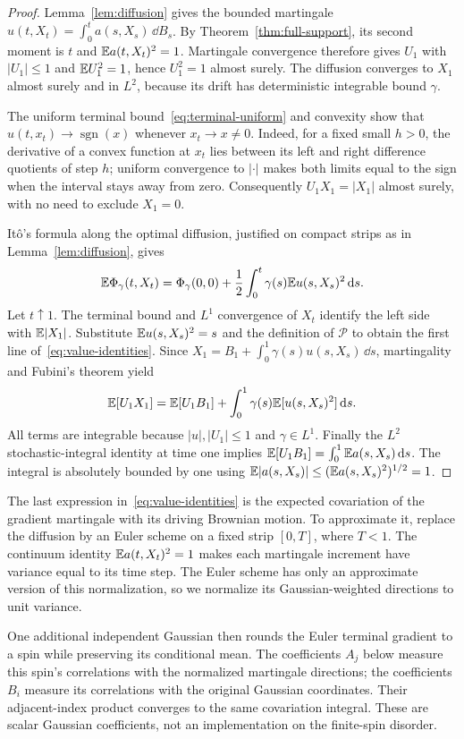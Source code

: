 \begin{proof}
Lemma~\ref{lem:diffusion} gives the bounded martingale
$u(t,X_t)=\int_0^t a(s,X_s)\,\dd B_s$. By
Theorem~\ref{thm:full-support}, its second moment is $t$ and
$\mathbb E a(t,X_t)^2=1$. Martingale convergence therefore gives $U_1$ with
$|U_1|\leq1$ and $\mathbb E U_1^2=1$, hence $U_1^2=1$ almost surely.
The diffusion converges to $X_1$ almost surely and in $L^2$, because its
drift has deterministic integrable bound $\gamma$.

The uniform terminal bound~\eqref{eq:terminal-uniform} and convexity
show that $u(t,x_t)\to\operatorname{sgn}(x)$ whenever $x_t\to x\ne0$.
Indeed, for a fixed small $h>0$, the derivative of a convex function at
$x_t$ lies between its left and right difference quotients of step $h$;
uniform convergence to $|\cdot|$ makes both limits equal to the sign
when the interval stays away from zero. Consequently
$U_1X_1=|X_1|$ almost surely, with no need to exclude $X_1=0$.

It\^o's formula along the optimal diffusion, justified on compact strips
as in Lemma~\ref{lem:diffusion}, gives
\[
 \mathbb E\Phi_\gamma(t,X_t)
  =\Phi_\gamma(0,0)+\frac12\int_0^t\gamma(s)
                                  \mathbb E u(s,X_s)^2\,\mathrm d s.
\]
Let $t\uparrow1$. The terminal bound and $L^1$ convergence of $X_t$
identify the left side with $\mathbb E|X_1|$. Substitute
$\mathbb E u(s,X_s)^2=s$ and the definition of $\mathcal P$ to obtain the
first line of~\eqref{eq:value-identities}.
Since $X_1=B_1+\int_0^1\gamma(s)u(s,X_s)\,\dd s$, martingality
and Fubini's theorem yield
\[
 \mathbb E[U_1X_1]=\mathbb E[U_1B_1]
       +\int_0^1\gamma(s)\mathbb E[u(s,X_s)^2]\,\mathrm d s.
\]
All terms are integrable because $|u|,|U_1|\leq1$ and $\gamma\in L^1$.
Finally the $L^2$ stochastic-integral identity at time one implies
$\mathbb E[U_1B_1]=\int_0^1\mathbb E a(s,X_s)\,\mathrm d s$.
The integral is absolutely bounded by one using
$\mathbb E|a(s,X_s)|\leq(\mathbb E a(s,X_s)^2)^{1/2}=1$.
\end{proof}

The last expression in~\eqref{eq:value-identities} is the expected
covariation of the gradient martingale with its driving Brownian motion.
To approximate it, replace the diffusion by an Euler scheme on a fixed
strip $[0,T]$, where $T<1$. The continuum identity $\mathbb E a(t,X_t)^2=1$
makes each martingale increment have variance equal to its time step.
The Euler scheme has only an approximate version of this normalization,
so we normalize its Gaussian-weighted directions to unit variance.

One additional independent Gaussian then rounds the Euler terminal
gradient to a spin while preserving its conditional mean. The coefficients
$A_j$ below measure this spin's correlations with the normalized
martingale directions; the coefficients $B_i$ measure its correlations
with the original Gaussian coordinates. Their adjacent-index product
converges to the same covariation integral. These are scalar Gaussian
coefficients, not an implementation on the finite-spin disorder.

